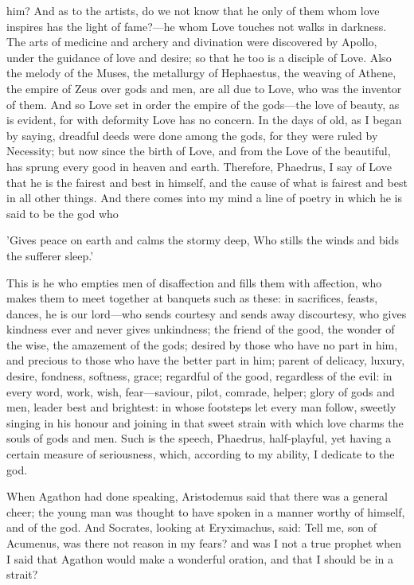him? And as to the artists, do we not know that he only of them whom love inspires has the light of fame?---he whom Love touches not walks in darkness. The arts of medicine and archery and divination were discovered by Apollo, under the guidance of love and desire; so that he too is a disciple of Love. Also the melody of the Muses, the metallurgy of Hephaestus, the weaving of Athene, the empire of Zeus over gods and men, are all due to Love, who was the inventor of them. And so Love set in order the empire of the gods---the love of beauty, as is evident, for with deformity Love has no concern. In the days of old, as I began by saying, dreadful deeds were done among the gods, for they were ruled by Necessity; but now since the birth of Love, and from the Love of the beautiful, has sprung every good in heaven and earth. Therefore, Phaedrus, I say of Love that he is the fairest and best in himself, and the cause of what is fairest and best in all other things. And there comes into my mind a line of poetry in which he is said to be the god who

\para[77] 'Gives peace on earth and calms the stormy deep, Who stills the winds and bids the sufferer sleep.'

\para[78] This is he who empties men of disaffection and fills them with affection, who makes them to meet together at banquets such as these: in sacrifices, feasts, dances, he is our lord---who sends courtesy and sends away discourtesy, who gives kindness ever and never gives unkindness; the friend of the good, the wonder of the wise, the amazement of the gods; desired by those who have no part in him, and precious to those who have the better part in him; parent of delicacy, luxury, desire, fondness, softness, grace; regardful of the good, regardless of the evil: in every word, work, wish, fear---saviour, pilot, comrade, helper; glory of gods and men, leader best and brightest: in whose footsteps let every man follow, sweetly singing in his honour and joining in that sweet strain with which love charms the souls of gods and men. Such is the speech, Phaedrus, half-playful, yet having a certain measure of seriousness, which, according to my ability, I dedicate to the god.

\para[79] When Agathon had done speaking, Aristodemus said that there was a general cheer; the young man was thought to have spoken in a manner worthy of himself, and of the god. And Socrates, looking at Eryximachus, said: Tell me, son of Acumenus, was there not reason in my fears? and was I not a true prophet when I said that Agathon would make a wonderful oration, and that I should be in a strait?

